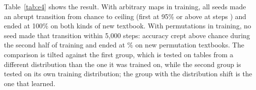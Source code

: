 Table~\ref{tab:e4} shows the result.
With arbitrary maps in training, all \EFourTrainMapsSeeds{} seeds made an abrupt transition from chance to ceiling (first at 95\% or above at steps \EFourTrainMapsFirst) and ended at 100\% on both kinds of new textbook.
With permutations in training, no seed made that transition within 5{,}000 steps: accuracy crept above chance during the second half of training and ended at \EFourTrainPermsFollowPermList\% on new permutation textbooks.
The comparison is tilted against the first group, which is tested on tables from a different distribution than the one it was trained on, while the second group is tested on its own training distribution; the group with the distribution shift is the one that learned.
